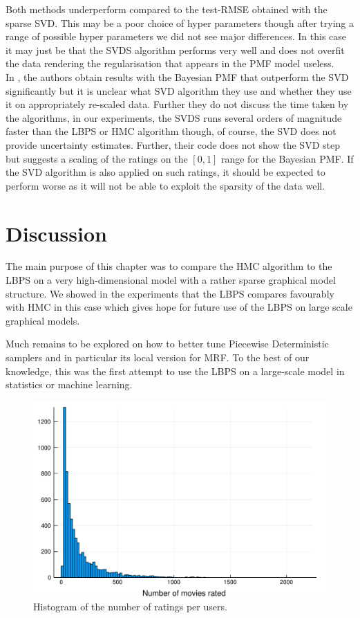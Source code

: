 Both methods underperform compared to the test-RMSE obtained with the sparse SVD.  
This may be a poor choice of hyper parameters though after trying a range of possible hyper parameters we did not see major differences. In this case it may just be that the SVDS algorithm performs very well and does not overfit the data rendering the regularisation that appears in the PMF model useless. \\
In \citep{mnih08}, the authors obtain results with the Bayesian PMF that outperform the SVD significantly but it is unclear what SVD algorithm they use and whether they use it on appropriately re-scaled data. 
Further they do not discuss the time taken by the algorithms, in our experiments, the SVDS runs several orders of magnitude faster than the LBPS or HMC algorithm though, of course, the SVD does not provide uncertainty estimates. 
Further, their code does not show the SVD step but suggests a scaling of the ratings on the $[0, 1]$ range for the Bayesian PMF. If the SVD algorithm is also applied on such ratings, it should be expected to perform worse as it will not be able to exploit the sparsity of the data well.

\section{Discussion}

The main purpose of this chapter was to compare the HMC algorithm to the LBPS on a very high-dimensional model with a rather sparse graphical model structure. We showed in the experiments that the LBPS compares favourably with HMC in this case which gives hope for future use of the LBPS on large scale graphical models.

Much remains to be explored on how to better tune Piecewise Deterministic samplers and in particular its local version for MRF. To the best of our knowledge, this was the first attempt to use the LBPS on a large-scale model in statistics or machine learning. 

\begin{figure}[!h]
\center
	\includegraphics[width=.7\textwidth]{figures/lbp/hist}
	\caption{\label{fig:nratings}Histogram of the number of ratings per users.}
\end{figure}

